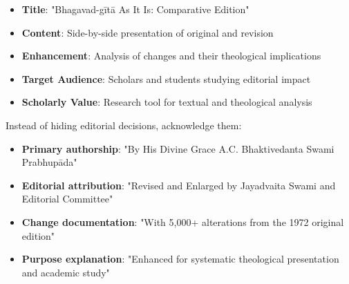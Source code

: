 \documentclass[12pt,twoside]{book}
\begin{document}
\begin{itemize}
\item \textbf{\textbf{Title}}: "Bhagavad-gītā As It Is: Comparative Edition"
\item \textbf{\textbf{Content}}: Side-by-side presentation of original and revision
\item \textbf{\textbf{Enhancement}}: Analysis of changes and their theological implications
\item \textbf{\textbf{Target Audience}}: Scholars and students studying editorial impact
\item \textbf{\textbf{Scholarly Value}}: Research tool for textual and theological analysis
\end{itemize}

Instead of hiding editorial decisions, acknowledge them:

\begin{itemize}
\item \textbf{\textbf{Primary authorship}}: "By His Divine Grace A.C. Bhaktivedanta Swami Prabhupāda"
\item \textbf{\textbf{Editorial attribution}}: "Revised and Enlarged by Jayadvaita Swami and Editorial Committee"
\item \textbf{\textbf{Change documentation}}: "With 5,000+ alterations from the 1972 original edition"
\item \textbf{\textbf{Purpose explanation}}: "Enhanced for systematic theological presentation and academic study"
\end{itemize}
\end{document}
